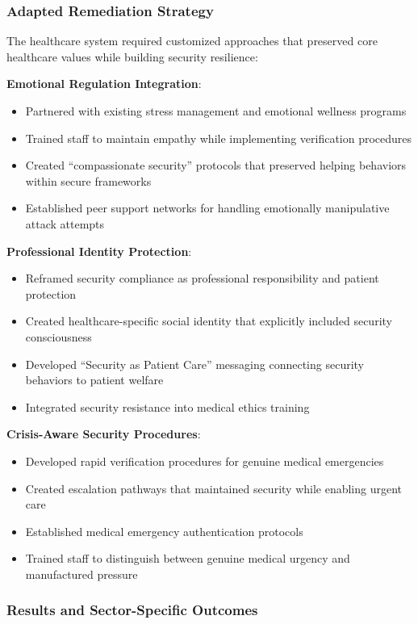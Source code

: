 \documentclass[11pt,a4paper]{article}
\begin{document}
\subsubsection{Adapted Remediation Strategy}

The healthcare system required customized approaches that preserved core healthcare values while building security resilience:

\textbf{Emotional Regulation Integration}:
\begin{itemize}
\item Partnered with existing stress management and emotional wellness programs
\item Trained staff to maintain empathy while implementing verification procedures
\item Created ``compassionate security'' protocols that preserved helping behaviors within secure frameworks
\item Established peer support networks for handling emotionally manipulative attack attempts
\end{itemize}

\textbf{Professional Identity Protection}:
\begin{itemize}
\item Reframed security compliance as professional responsibility and patient protection
\item Created healthcare-specific social identity that explicitly included security consciousness
\item Developed ``Security as Patient Care'' messaging connecting security behaviors to patient welfare
\item Integrated security resistance into medical ethics training
\end{itemize}

\textbf{Crisis-Aware Security Procedures}:
\begin{itemize}
\item Developed rapid verification procedures for genuine medical emergencies
\item Created escalation pathways that maintained security while enabling urgent care
\item Established medical emergency authentication protocols
\item Trained staff to distinguish between genuine medical urgency and manufactured pressure
\end{itemize}

\subsubsection{Results and Sector-Specific Outcomes}
\end{document}
